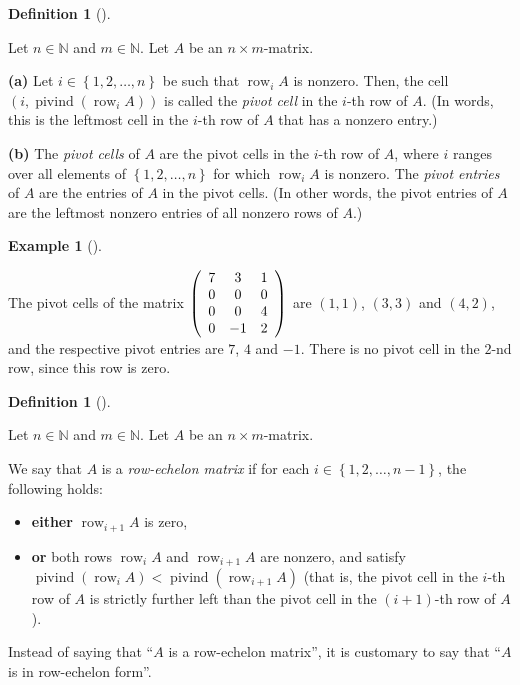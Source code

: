\documentclass[numbers=enddot,12pt,final,onecolumn,notitlepage]{scrartcl}%
\theoremstyle{definition}
\newtheorem{defi}[theo]{Definition}
\newenvironment{definition}[1][]
{\begin{defi}[#1]\begin{leftbar}}
{\end{leftbar}\end{defi}}
\newtheorem{exam}[theo]{Example}
\newenvironment{example}[1][]
{\begin{exam}[#1]\begin{leftbar}}
{\end{leftbar}\end{exam}}
\begin{document}
\begin{definition}
\label{def.pivot-cells}Let $n\in\mathbb{N}$ and $m\in\mathbb{N}$. Let $A$ be
an $n\times m$-matrix.

\textbf{(a)} Let $i\in\left\{  1,2,\ldots,n\right\}  $ be such that
$\operatorname*{row}\nolimits_{i}A$ is nonzero. Then, the cell $\left(
i,\operatorname*{pivind}\left(  \operatorname*{row}\nolimits_{i}A\right)
\right)  $ is called the \textit{pivot cell} in the $i$-th row of $A$. (In
words, this is the leftmost cell in the $i$-th row of $A$ that has a nonzero entry.)

\textbf{(b)} The \textit{pivot cells} of $A$ are the pivot cells in the $i$-th
row of $A$, where $i$ ranges over all elements of $\left\{  1,2,\ldots
,n\right\}  $ for which $\operatorname*{row}\nolimits_{i}A$ is nonzero. The
\textit{pivot entries} of $A$ are the entries of $A$ in the pivot cells. (In
other words, the pivot entries of $A$ are the leftmost nonzero entries of all
nonzero rows of $A$.)
\end{definition}

\begin{example}
The pivot cells of the matrix $\left(
\begin{array}
[c]{ccc}%
7 & 3 & 1\\
0 & 0 & 0\\
0 & 0 & 4\\
0 & -1 & 2
\end{array}
\right)  $ are $\left(  1,1\right)  $, $\left(  3,3\right)  $ and $\left(
4,2\right)  $, and the respective pivot entries are $7$, $4$ and $-1$. There
is no pivot cell in the $2$-nd row, since this row is zero.
\end{example}

\begin{definition}
\label{def.row-echelon}Let $n\in\mathbb{N}$ and $m\in\mathbb{N}$. Let $A$ be
an $n\times m$-matrix.

We say that $A$ is a \textit{row-echelon matrix} if for each $i\in\left\{
1,2,\ldots,n-1\right\}  $, the following holds:

\begin{itemize}
\item \textbf{either} $\operatorname*{row}\nolimits_{i+1}A$ is zero,

\item \textbf{or} both rows $\operatorname*{row}\nolimits_{i}A$ and
$\operatorname*{row}\nolimits_{i+1}A$ are nonzero, and satisfy
$\operatorname*{pivind}\left(  \operatorname*{row}\nolimits_{i}A\right)
<\operatorname*{pivind}\left(  \operatorname*{row}\nolimits_{i+1}A\right)  $
(that is, the pivot cell in the $i$-th row of $A$ is strictly further left
than the pivot cell in the $\left(  i+1\right)  $-th row of $A$).
\end{itemize}

Instead of saying that \textquotedblleft$A$ is a row-echelon
matrix\textquotedblright, it is customary to say that \textquotedblleft$A$ is
in row-echelon form\textquotedblright.
\end{definition}
\end{document}
